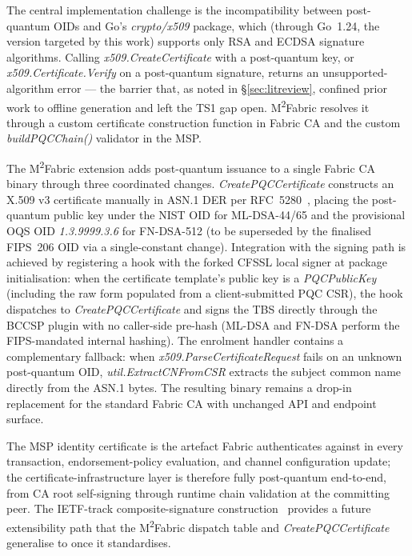 \documentclass{ieeetj}
\makeatletter
\newcommand{\mfabric}{M\textsuperscript{2}Fabric}
\def\subsubsectionfont{\fontfamily{\sfdefault}\fontsize{9}{12}\selectfont\bfseries\raggedright}
\def\subsubsection{\@startsection{subsubsection}{3}{\z@}{-8pt \@plus -2pt \@minus -2pt}{1pt}{\subsubsectionfont}}
\makeatother
\begin{document}
The central implementation challenge is the incompatibility between
post-quantum OIDs and Go's \textit{crypto/x509} package, which (through
Go~1.24, the version targeted by this work) supports only RSA and ECDSA
signature algorithms. Calling \textit{x509.CreateCertificate} with a
post-quantum key, or \textit{x509.Certificate.Verify} on a post-quantum
signature, returns an unsupported-algorithm error --- the barrier that,
as noted in \S\ref{sec:litreview}, confined prior work to offline
generation and left the TS1 gap open. \mfabric{} resolves it through a
custom certificate construction function in Fabric CA and the custom
\textit{buildPQCChain()} validator in the MSP.

\subsubsection{FABRIC CA POST-QUANTUM EXTENSION}

The \mfabric{} extension adds post-quantum issuance to a single Fabric CA
binary through three coordinated changes. \textit{CreatePQCCertificate}
constructs an X.509 v3 certificate manually in ASN.1 DER per
RFC~5280~\cite{rfc5280}, placing the post-quantum public key under the
NIST OID for ML-DSA-44/65 and the provisional OQS OID
\textit{1.3.9999.3.6} for FN-DSA-512 (to be superseded by the finalised
FIPS~206 OID via a single-constant change). Integration with the signing
path is achieved by registering a hook with the forked CFSSL local
signer at package initialisation: when the certificate template's public
key is a \textit{PQCPublicKey} (including the raw form populated from a
client-submitted PQC CSR), the hook dispatches to
\textit{CreatePQCCertificate} and signs the TBS directly through the
BCCSP plugin with no caller-side pre-hash (ML-DSA and FN-DSA perform the
FIPS-mandated internal hashing). The enrolment handler contains a
complementary fallback: when \textit{x509.ParseCertificateRequest} fails
on an unknown post-quantum OID, \textit{util.ExtractCNFromCSR} extracts
the subject common name directly from the ASN.1 bytes. The resulting
binary remains a drop-in replacement for the standard Fabric CA with
unchanged API and endpoint surface.

The MSP identity certificate is the artefact Fabric authenticates against
in every transaction, endorsement-policy evaluation, and channel
configuration update; the certificate-infrastructure layer is therefore
fully post-quantum end-to-end, from CA root self-signing through runtime
chain validation at the committing peer. The IETF-track
composite-signature construction~\cite{ounsworth2024composite} provides a
future extensibility path that the \mfabric{} dispatch table and
\textit{CreatePQCCertificate} generalise to once it standardises.
\end{document}
